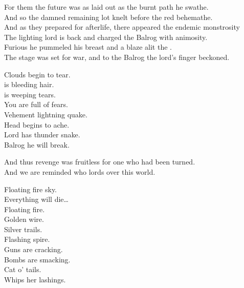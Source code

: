 For them the future was as laid out as the burnt path he swathe. \\
And so the damned remaining lot knelt before the red behemathe. \\

And as they prepared for afterlife, there appeared the endemic monstrosity \\
The lighting lord is back and charged the Balrog with animosity. \\

Furious he pummeled his breast and a blaze alit the . \\
The stage was set for war, and to the Balrog the lord's finger beckoned. \\





Clouds begin to tear. \\
 is bleeding hair. \\
 is weeping tears. \\
You are full of fears. \\

Vehement lightning quake. \\
Head begins to ache. \\
Lord has thunder snake. \\
Balrog he will break. \\


And thus revenge was fruitless for one who had been turned. \\
And we are reminded who lords over this  world. \\


Floating fire sky. \\
Everything will die… \\

Floating fire. \\
Golden wire. \\
Silver trails. \\
Flashing spire. \\

Guns are cracking. \\
Bombs are smacking. \\
Cat o' tails. \\
Whips her lashings. \\

